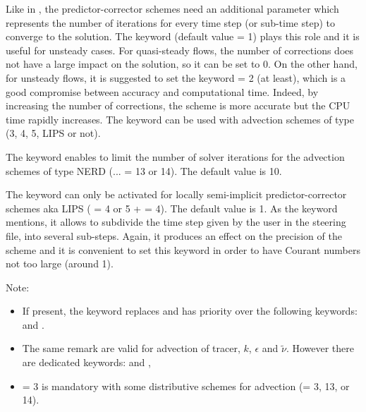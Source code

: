 Like in , the predictor-corrector schemes need an additional
parameter which represents the number of iterations for every time step
(or sub-time step) to converge to the solution.
The keyword 
(default value = 1) plays this role and it is useful for unsteady cases.
For quasi-steady flows, the number of corrections does not have a large impact
on the solution, so it can be set to 0.
On the other hand, for unsteady flows, it is suggested to set the keyword
 = 2 (at least),
which is a good compromise between accuracy and computational time.
Indeed, by increasing the number of corrections, the scheme is more accurate but
the CPU time rapidly increases.
The keyword  can be used
with advection schemes of type (3, 4, 5, LIPS or not).

The keyword 
enables to limit the number of solver iterations for the advection schemes
of type NERD (... = 13 or 14).
The default value is 10.

The keyword  can only be
activated for locally semi-implicit predictor-corrector schemes aka LIPS
( = 4 or 5
+  = 4).
The default value is 1.
As the keyword mentions, it allows to subdivide the time step given by the user
in the steering file, into several sub-steps.
Again, it produces an effect on the precision of the scheme and it is convenient
to set this keyword in order to have Courant numbers not too large (around 1).


\begin{WarningBlock}{Note:}
\begin{itemize}

\item If present, the keyword 
replaces and has priority over the following keywords:
 and .

\item The same remark are valid for advection of tracer, $k$, $\epsilon$ and
$\tilde{\nu}$.
However there are dedicated keywords: 
and ,

\item {} = 3 is mandatory with some distributive schemes
for advection (= 3, 13, or 14).
\end{itemize}
\end{WarningBlock}

